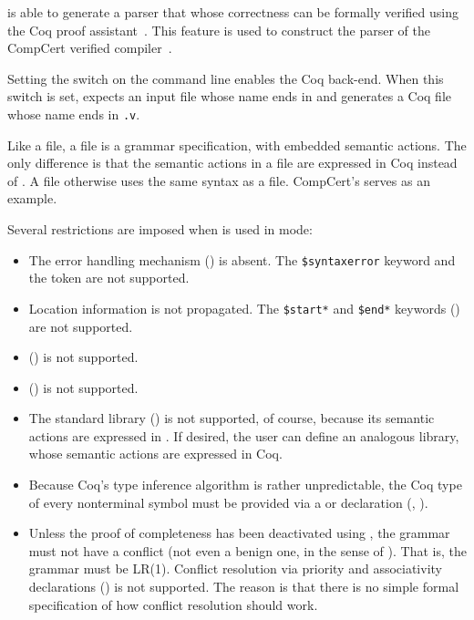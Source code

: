 \documentclass[onecolumn,11pt,nocopyrightspace,preprint]{sigplanconf}
\begin{document}
\menhir is able to generate a parser that whose correctness can be formally
verified using the Coq proof assistant~\cite{jourdan-leroy-pottier-12}. This
feature is used to construct the parser of the CompCert verified
compiler~\cite{compcert}.

Setting the \ocoq switch on the command line enables the Coq back-end.  When
this switch is set, \menhir expects an input file whose name ends
in \vy and generates a Coq file whose name ends
in \texttt{.v}.

Like a \mly file, a \vy file is a grammar specification,
with embedded semantic actions. The only difference is that the semantic
actions in a \vy file are expressed in Coq instead
of \ocaml. A \vy file otherwise uses the same syntax as
a \mly file. CompCert's
serves as an example.

Several restrictions are imposed when \menhir is used in \ocoq mode:
%
\begin{itemize}
\item The error handling mechanism () is absent.
      The \verb+$syntaxerror+ keyword and the \error token are not supported.
\item Location information is not propagated. The \verb+$start*+ and \verb+$end*+
      keywords () are not supported.
\item \dparameter () is not supported.
\item \dinline () is not supported.
\item The standard library () is not supported, of course,
      because its semantic actions are expressed in \ocaml. If desired, the user can define
      an analogous library, whose semantic actions are expressed in Coq.
\item Because Coq's type inference algorithm is rather unpredictable,
      the Coq type of every nonterminal symbol must be provided via a
      \dtype or \dstart declaration (, ).
\item Unless the proof of completeness has been deactivated using
  \ocoqnocomplete, the grammar must not have a conflict
  (not even a benign one, in the sense of ).
  That is, the grammar must be LR(1). Conflict resolution via
  priority and associativity declarations ()
  is not supported.
  The reason is that there is no simple formal specification
  of how conflict resolution should work.
\end{itemize}
\end{document}
